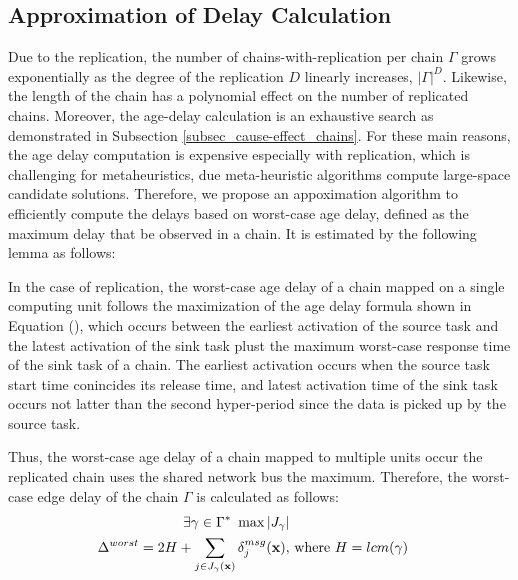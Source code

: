 \subsection{Approximation of Delay Calculation}
Due to the replication, the number of chains-with-replication per chain $\Gamma$ grows exponentially as the degree of the replication $D$ linearly increases, $|\Gamma|^D$. Likewise, the length of the chain has a polynomial effect on the number of replicated chains. Moreover, the age-delay calculation is an exhaustive search as demonstrated in Subsection \ref{subsec_cause-effect_chains}. For these main reasons, the age delay computation is expensive especially with replication, which is challenging for metaheuristics, due meta-heuristic algorithms compute large-space candidate solutions. Therefore, we propose an appoximation algorithm to efficiently compute the delays based on worst-case age delay, defined as the maximum delay that be observed in a chain. It is estimated by the following lemma as follows:
\begin{lemma} 
	In the case of replication, the worst-case age delay of a chain mapped on a single computing unit follows the maximization of the age delay formula shown in Equation (), which occurs between the earliest activation of the source task and the latest activation of the sink task plust the maximum worst-case response time of the sink task of a chain. The earliest activation occurs when the source task start time conincides its release time, and latest activation time of the sink task occurs not latter than the second hyper-period since the data is picked up by the source task. 
	
	
	Thus, the worst-case age delay of a chain mapped to multiple units occur the replicated chain uses the shared network bus the maximum. Therefore, the worst-case edge delay of the chain $\Gamma$ is calculated as follows:
	\begin{align}
		\exists \gamma\in\Gamma^*\ \max{|J_\gamma|}\\
		\Delta^{worst}=2H+\sum_{j\in J_{\gamma}(\textbf{x})}{\delta^{msg}_j(\textbf{x})}, & \mbox{ where } H=lcm(\gamma)
	\end{align}
\end{lemma}




